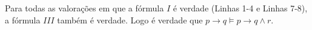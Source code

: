 \documentclass[11pt,a4paper,oneside]{article}
\begin{document}
\begin{enumerate}
{			Para todas as valorações em que a fórmula $I$ é verdade (Linhas 1-4 e Linhas 7-8), a fórmula $III$ também é verdade. Logo é verdade que $p \rightarrow q \models p \rightarrow q \wedge r$.  
		}
	
\end{enumerate}
\end{document}
